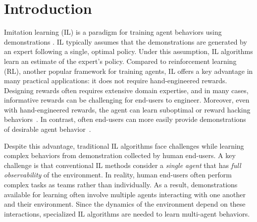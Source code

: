 
\section{Introduction}
\label{sec. intro}
Imitation learning (IL) is a paradigm for training agent behaviors using demonstrations \cite{abbeel2004apprenticeship}. IL typically assumes that the demonstrations are generated by an expert following a single, optimal policy. Under this assumption, IL algorithms learn an estimate of the expert's policy. Compared to reinforcement learning (RL), another popular framework for training agents, IL offers a key advantage in many practical applications: it does not require hand-engineered rewards. Designing rewards often requires extensive domain expertise, and in many cases, informative rewards can be challenging for end-users to engineer. Moreover, even with hand-engineered rewards, the agent can learn suboptimal or reward hacking behaviors~\cite{amodei2016concrete, sutton2018reinforcement}. In contrast, often end-users can more easily provide demonstrations of desirable agent behavior~\cite{osa2018algorithmic, arora2021survey, chernova2022robot}.

Despite this advantage, traditional IL algorithms face challenges while learning complex behaviors from demonstration collected by human end-users. A key challenge is that conventional IL methods consider a \textit{single agent} that has \textit{full observability} of the environment. In reality, human end-users often perform complex tasks as teams rather than individually. As a result, demonstrations available for learning often involve multiple agents interacting with one another and their environment. Since the dynamics of the environment depend on these interactions, specialized IL algorithms are needed to learn multi-agent behaviors.



